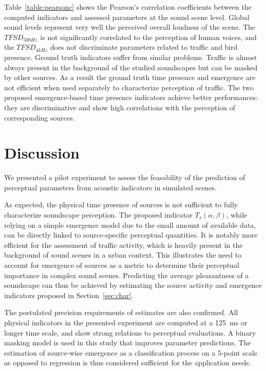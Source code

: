 \documentclass{article}
\begin{document}
\begin{sloppy}
Table~\ref{table:pearsonc} shows the Pearson's correlation coefficients between the computed indicators and assessed parameters at the sound scene level. Global sound levels represent very well the perceived overall loudness of the scene. The $TFSD_{500Hz}$ is not significantly correlated to the perception of human voices, and the $TFSD_{4kHz}$ does not discriminate parameters related to traffic and bird presence. Ground truth indicators suffer from similar problems. Traffic is almost always present in the background of the studied soundscapes but can be masked by other sources. As a result the ground truth time presence and emergence are not efficient when used separately to characterize perception of traffic. The two proposed emergence-based time presence indicators achieve better performances: they are discriminative and show high correlations with the perception of corresponding sources.


\section{Discussion}
\label{sec:disc}

We presented a pilot experiment to assess the feasability of the prediction of perceptual parameters from acoustic indicators in simulated scenes. 

As expected, the physical time presence of sources is not sufficient to fully characterize soundscape perception. The proposed indicator $T_s(\alpha, \beta)$, while relying on a simple emergence model due to the small amount of available data, can be directly linked to source-specific perceptual quantities. It is notably more efficient for the assessment of traffic activity, which is heavily present in the background of sound scenes in a urban context. This illustrates the need to account for emergence of sources as a metric to determine their perceptual importance in complex sound scenes. Predicting the average pleasantness of a soundscape can thus be achieved by estimating the source activity and emergence indicators proposed in Section~\ref{sec:char}. 

The postulated precision requirements of estimates are also confirmed. All physical indicators in the presented experiment are computed at a 125~ms or longer time scale, and show strong relations to perceptual evaluations. A binary masking model is used in this study that improves parameter predictions. The estimation of source-wise emergence as a classification process on a 5-point scale as opposed to regression is thus considered sufficient for the application needs.


\end{sloppy}
\end{document}
